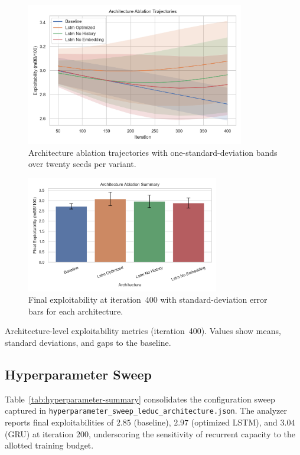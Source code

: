 \documentclass[11pt]{article}
\begin{document}
\begin{figure}[H]
    \centering
    \includegraphics[width=0.85\textwidth]{figures/architecture_ablation_trajectory.png}
    \caption{Architecture ablation trajectories with one-standard-deviation bands over twenty seeds per variant.}
    \label{fig:arch-trajectory}
\end{figure}

\begin{figure}[H]
    \centering
    \includegraphics[width=0.75\textwidth]{figures/architecture_ablation_summary.png}
    \caption{Final exploitability at iteration~400 with standard-deviation error bars for each architecture.}
    \label{fig:arch-summary}
\end{figure}

\begin{table}[H]
    \centering
    \caption{Architecture-level exploitability metrics (iteration~400). Values show means, standard deviations, and gaps to the baseline.}
    \label{tab:ablation-summary}
    
\end{table}

\subsection{Hyperparameter Sweep}
Table~\ref{tab:hyperparameter-summary} consolidates the configuration sweep captured in \texttt{hyperparameter\_sweep\_leduc\_architecture.json}. The analyzer reports final exploitabilities of $2.85$ (baseline), $2.97$ (optimized LSTM), and $3.04$ (GRU) at iteration 200, underscoring the sensitivity of recurrent capacity to the allotted training budget.
\end{document}
